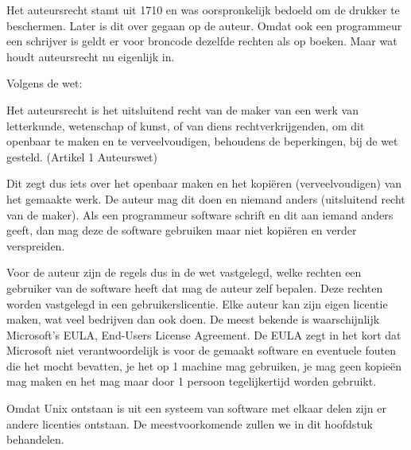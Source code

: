 Het auteursrecht stamt uit 1710 en was oorspronkelijk bedoeld om de drukker te beschermen. Later is dit over gegaan op
de auteur. Omdat ook een programmeur een schrijver is geldt er voor broncode dezelfde rechten als op boeken. Maar wat
houdt auteursrecht nu eigenlijk in.

{
Volgens de wet:}

{
{\textquotedbl}Het auteursrecht is het uitsluitend recht van de maker van een werk van letterkunde,
wetenschap of kunst, of van diens rechtverkrijgenden, om dit openbaar te maken en te verveelvoudigen, behoudens de
beperkingen, bij de wet gesteld.{\textquotedbl} (Artikel 1 Auteurswet) }

{
Dit zegt dus iets over het openbaar maken en het kopi\"eren (verveelvoudigen) van het gemaakte werk. De auteur mag dit
doen en niemand anders (uitsluitend recht van de maker). Als een programmeur software schrift en dit aan iemand anders
geeft, dan mag deze de software gebruiken maar niet kopi\"eren en verder verspreiden.}

{
Voor de auteur zijn de regels dus in de wet vastgelegd, welke rechten een gebruiker van de software heeft dat mag de
auteur zelf bepalen. Deze rechten worden vastgelegd in een gebruikerslicentie. Elke auteur kan zijn eigen licentie
maken, wat veel bedrijven dan ook doen. De meest bekende is waarschijnlijk Microsoft's EULA, End-Users
License Agreement. De EULA zegt in het kort dat Microsoft niet verantwoordelijk is voor de gemaakt software en
eventuele fouten die het mocht bevatten, je het op 1 machine mag gebruiken, je mag geen kopie\"en mag maken en het mag
maar door 1 persoon tegelijkertijd worden gebruikt.}

{
Omdat Unix ontstaan is uit een systeem van software met elkaar delen zijn er andere licenties ontstaan. De
meestvoorkomende zullen we in dit hoofdstuk behandelen.}

